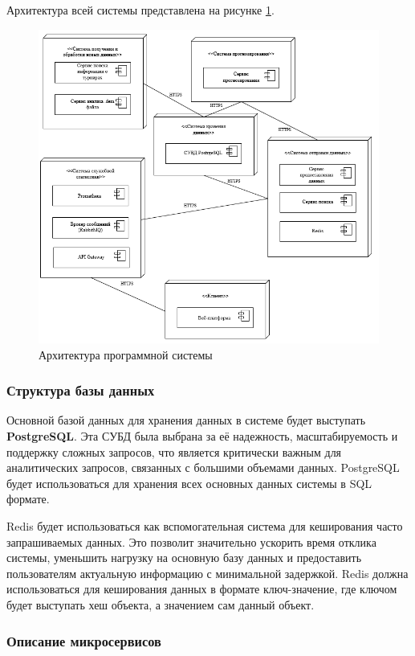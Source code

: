 Архитектура всей системы представлена на рисунке \ref{fig:-architecture}.
\begin{figure}
	\centering
	\includegraphics[width=0.9\linewidth]{"images/Архитектура"}
	\caption{Архитектура программной системы}
	\label{fig:-architecture}
\end{figure}

\subsubsection{Структура базы данных}

Основной базой данных для хранения данных в системе будет выступать \textbf{PostgreSQL}. Эта СУБД была выбрана за её надежность, масштабируемость и поддержку сложных запросов, что является критически важным для аналитических запросов, связанных с большими объемами данных. PostgreSQL будет использоваться для хранения всех основных данных системы в SQL формате.

Redis будет использоваться как вспомогательная система для кеширования часто запрашиваемых данных. Это позволит значительно ускорить время отклика системы, уменьшить нагрузку на основную базу данных и предоставить пользователям актуальную информацию с минимальной задержкой. Redis должна использоваться для кеширования данных в формате ключ-значение, где ключом будет выступать хеш объекта, а значением сам данный объект.

\subsubsection{Описание микросервисов}

